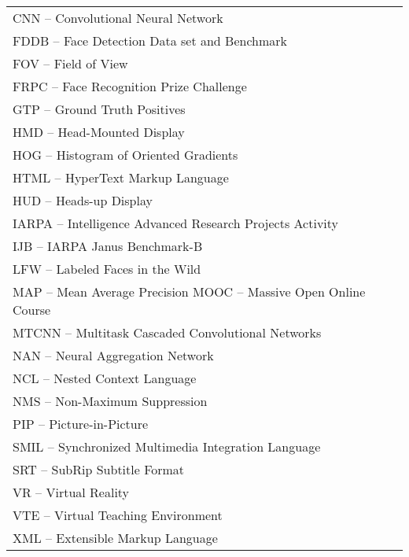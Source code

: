 
\begin{thenotations}
\renewcommand{\arraystretch}{1.5}
  \noindent
  \begin{tabular}{ll}

CNN -- Convolutional Neural Network\\
FDDB -- Face Detection Data set and Benchmark\\
FOV -- Field of View\\
FRPC -- Face Recognition Prize Challenge\\
GTP -- Ground Truth Positives\\
HMD -- Head-Mounted Display\\
HOG -- Histogram of Oriented Gradients\\
HTML -- HyperText Markup Language\\
HUD -- Heads-up Display\\
IARPA -- Intelligence Advanced Research Projects Activity\\
IJB -- IARPA Janus Benchmark-B\\
LFW -- Labeled Faces in the Wild\\
MAP -- Mean Average Precision
MOOC -- Massive Open Online Course\\
MTCNN -- Multitask Cascaded Convolutional Networks\\
NAN -- Neural Aggregation Network\\
NCL -- Nested Context Language\\
NMS -- Non-Maximum Suppression\\
PIP -- Picture-in-Picture\\
SMIL -- Synchronized Multimedia Integration Language\\
SRT -- SubRip Subtitle Format\\
VR -- Virtual Reality\\
VTE -- Virtual Teaching Environment\\
XML -- Extensible Markup Language\\

  \end{tabular}

\end{thenotations}